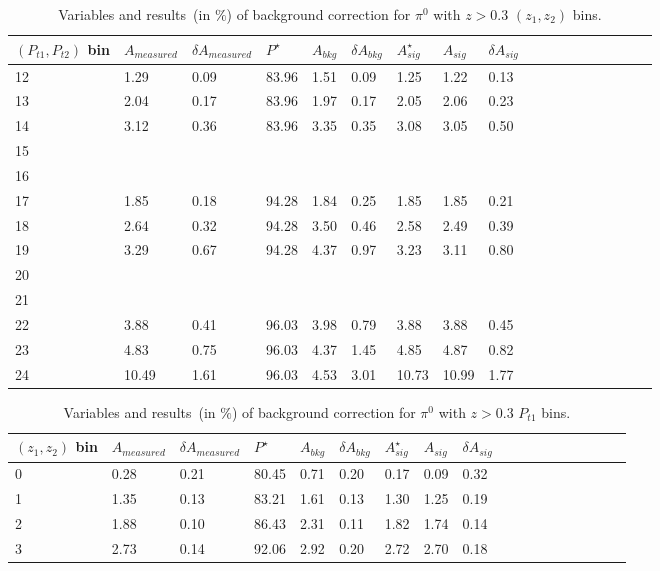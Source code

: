 \begin{table}[H]\footnotesize
\centering
\begin{tabular}{|l|l|l|l|l|l|l|l|l|l|l|l|l|l|l|l|l|l|}
\\ \hline
$(P_{t1},P_{t2})$ bin & $A_{measured}$ & $\delta A_{measured}$ & $P^{\star}$ & $A_{bkg}$ & $\delta A_{bkg}$ & $A_{sig}^{\star}$ & $ A_{sig}$  & $\delta A_{sig}$ \\ \hline
12 & 1.29 & 0.09 & 83.96 & 1.51 & 0.09 & 1.25 & 1.22 & 0.13 \\ \hline 
13 & 2.04 & 0.17 & 83.96 & 1.97 & 0.17 & 2.05 & 2.06 & 0.23 \\ \hline 
14 & 3.12 & 0.36 & 83.96 & 3.35 & 0.35 & 3.08 & 3.05 & 0.50 \\ \hline 
15 &  &  &  &  &  &  &  &  \\ \hline 
16 & &  &  &  &  &  &  &  &  \\ \hline  
17 & 1.85 & 0.18 & 94.28 & 1.84 & 0.25 & 1.85 & 1.85 & 0.21 \\ \hline 
18 & 2.64 & 0.32 & 94.28 & 3.50 & 0.46 & 2.58 & 2.49 & 0.39 \\ \hline 
19 & 3.29 & 0.67 & 94.28 & 4.37 & 0.97 & 3.23 & 3.11 & 0.80 \\ \hline 
20 & &  &  &  &  &  &  &  &  \\ \hline  
21 & &  &  &  &  &  &  &  &  \\ \hline 
22 & 3.88 & 0.41 & 96.03 & 3.98 & 0.79 & 3.88 & 3.88 & 0.45 \\ \hline 
23 & 4.83 & 0.75 & 96.03 & 4.37 & 1.45 & 4.85 & 4.87 & 0.82 \\ \hline 
24 & 10.49 & 1.61 & 96.03 & 4.53 & 3.01 & 10.73 & 10.99 & 1.77 \\ \hline 
 \end{tabular}
\caption{Variables and results~(in $\%$) of background correction for $\pi^0$ with $z>0.3$ $(z_1,z_2)$ bins. }
\label{tab:pi0comzbkgcor}
\end{table} 

\begin{table}[H]\footnotesize
\centering
\begin{tabular}{|l|l|l|l|l|l|l|l|l|l|l|l|l|l|l|l|l|l|}
\\ \hline
$(z_1,z_2)$ bin & $A_{measured}$ & $\delta A_{measured}$ & $P^{\star}$  & $A_{bkg}$ & $\delta A_{bkg}$ & $A_{sig}^{\star}$ & $ A_{sig}$  & $\delta A_{sig}$ \\ \hline
0 & 0.28 & 0.21 & 80.45 & 0.71 & 0.20 & 0.17 & 0.09 & 0.32 \\ \hline 
1 & 1.35 & 0.13 & 83.21 & 1.61 & 0.13 & 1.30 & 1.25 & 0.19 \\ \hline 
2 & 1.88 & 0.10 & 86.43 & 2.31 & 0.11 & 1.82 & 1.74 & 0.14 \\ \hline 
3 & 2.73 & 0.14 & 92.06 & 2.92 & 0.20 & 2.72 & 2.70 & 0.18 \\ \hline 
\end{tabular}
\caption{Variables and results~(in $\%$) of background correction for $\pi^0$ with $z>0.3$ $P_{t1}$ bins. }
\label{tab:pi0sinptbkgcor}
\end{table}


